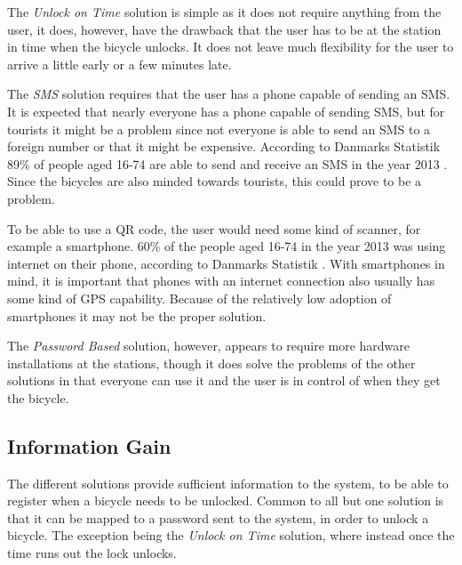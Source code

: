 The \textit{Unlock on Time} solution is simple as it does not require anything from the user, it does, however, have the drawback that the user has to be at the station in time when the bicycle unlocks.
It does not leave much flexibility for the user to arrive a little early or a few minutes late.

The \textit{SMS} solution requires that the user has a phone capable of sending an SMS. 
It is expected that nearly everyone has a phone capable of sending SMS, but for tourists it might be a problem since not everyone is able to send an SMS to a foreign number or that it might be expensive.
According to Danmarks Statistik 89\% of people aged 16-74 are able to send and receive an SMS in the year 2013 \citep{misc:dstMobilephone}.
Since the bicycles are also minded towards tourists, this could prove to be a problem.

To be able to use a QR code, the user would need some kind of scanner, for example a smartphone.
60\% of the people aged 16-74 in the year 2013 was using internet on their phone, according to Danmarks Statistik \citep{misc:dstMobilephone}.
With smartphones in mind, it is important that phones with an internet connection also usually has some kind of GPS capability.
Because of the relatively low adoption of smartphones it may not be the proper solution.

The \textit{Password Based} solution, however, appears to require more hardware installations at the stations, though it does solve the problems of the other solutions in that everyone can use it and the user is in control of when they get the bicycle.

\subsection{Information Gain}
The different solutions provide sufficient information to the system, to be able to register when a bicycle needs to be unlocked.
Common to all but one solution is that it can be mapped to a password sent to the system, in order to unlock a bicycle.
The exception being the \textit{Unlock on Time} solution, where instead once the time runs out the lock unlocks.